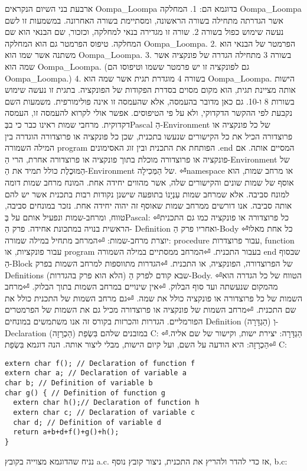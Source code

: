 \begin{טבלא}[!htbp]
      ארבעת בני השיום הנקראים Oompa\_Loompa בדוגמא הם:
      1. המחלקה Oompa\_Loompa אשר הגדרתה מתחילה בשורה הראשונה, ומסתיימת בשורה האחרונה. במשמעות זו לשם נעשה שימוש כפול בשורה 2. שורה זו מגדירה בנאי למחלקה, וכזכור, שם הבנאי הוא שם המחלקה. טיפוס הפרמטר גם הוא המחלקה Oompa\_Loompa.
      2. הפרמטר של הבנאי הוא משתנה אשר שמו הוא Oompa\_Loompa.
      3. בשורה 3 מתחילה הגדרה של פונקציה אשר שמה הוא Oompa\_Loompa. (גם לפונקציה זו יש פרמטר ששמו וטיפוסו הם Oompa\_Loompa.)
      4. בשורה 4 מוגדרת תגית אשר שמה הוא Oompa\_Loompa. הישות אותה מציינת תגית, הוא מקום מסוים בסדרת הפקודות של הפונקציה. בתגית זו נעשה שימוש בשורות 8 ו-10.
      גם כאן מדובר בהעמסה, אלא שהעמסה זו אינה פולימורפית. משמעות השם נקבעת לפי ההקשר הדקדוקי, ולא על פי הטיפוסים. אפשר אולי לקרוא להעמסה זו, העמסה דקדוקית.
      מרחבי שמות
      ראינו כבר כי בבְּPascal הַ-Environment של כל פונקציה או פרוצדורה הכיל את כל הקישורים שנעשו בתכנית, שכן כל פונקציה או פרוצדורה הוגדרה בין המילה השמורה program הפותחת את התכנית ובין זוג האסימונים .end המסיים אותה. אם פונקציה או פרוצדורה מוכלת בתוך פונקציה או פרוצדורה אחרת, הרי הַ-Environment של הַמּוּכֶלֶת כולל תמיד את הַ-Environment של הַמְּכִילָה.
⏎namespace או מרחב שמות, הוא אוסף של שמות
      שונים והקישורים שלה, אשר מהווים יחידה אחת.
      המונח מרחב שמות דומה למונח סביבה. אלא שמרחב
      שמות עִנְיָנוֹ בתופעה שישנן נקודות רבות בתכנית אשר
      יש להם אותה סביבה. אנו דורשים ממרחב שמות שאוסף
      זה יהוה יחידה אחת.
      נזכר במונחים סביבה, טווח, ומרחב-שמות ונפעיל אותם על בְּPascal:
⏎כל פרוצדורה או פונקציה כמו גם התכנית הראשית בנויה במתכונת אחידה. פרק הַ- Definition ואחריו פרק הַ-Body
⏎כל אחת מאלו יוצרת מרחב-שמות:
⏎המרחב מתחיל במילה שמורה: procedure עבור פרוצדרות, function עבור פונקציות, או program בעבור התכנית.
⏎המרחב ממסתיים במילה השמורה end שבסוף הַ-Block של הפרוצדורה, הפונקציה, או התכנית.
⏎הגדרות מתווספות למרחב השמות בפרק Definitions (הלא הוא פרק בהגדרות) שבא קודם לפרק הַ-Body.
⏎הטווח של כל הגדרה הוא מהמקום שנעשתה ועד סוף הבלוק.
⏎אין שינויים במרחב השמות בתוך הבלוק.
⏎מרחב השמות של כל פרוצדורה או פונקציה כולל את שמה.
⏎גם מרחב השמות של התכנית כולל את שם התכנית.
⏎מרחב השמות של פונקציה או פרוצדורה מכיל גם את השמות של הפרמטרים הפורמליים.
      הגדרות והכרזות
      בקורס זה אנו משתמשים במונחים Definition (הַגְדָּרָה) וְ-Declaration (הַכְרָזָה) במובנים שלהם בִּשְׂפַת C:
⏎הַגְדָּרָה: יצירת ישות, וקישור של שם אליה.
⏎הַכְרָזָה: היא הודעה על השם, ועל קיום הישות, מבלי ליצור אותה.
      הנה דוגמא בִּשְׂפַת C:
\begin{verbatim}
extern char f(); // Declaration of function f
extern char a; // Declaration of variable a
char b; // Definition of variable b
char g() { // Definition of function g
  extern char h();// Declaration of function h
  extern char c; // Declaration of variable c
  char d; // Definition of variable d
  return a+b+d+f()+g()+h();
}
\end{verbatim}
      נניח שהדוגמא מצוייה בקובץ a.c. אז כדי להדר ולהריץ את התכנית, ניצור קובץ נוסף, b.c:


\end{טבלא}
